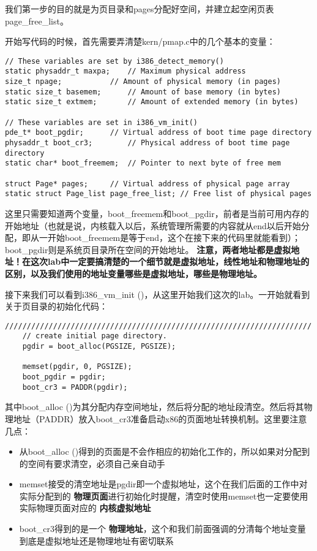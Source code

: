 \documentclass{article}
\newcommand{\highlight}[1]{{\bfseries \color{red}  #1}}
\newcommand{\funcname}[1]{{\ttfamily \small #1}}
\begin{document}
\begin{CJK*}{UTF8}{gkai}
我们第一步的目的就是为页目录和pages分配好空间，并建立起空闲页表page\_free\_list。


开始写代码的时候，首先需要弄清楚kern/pmap.c中的几个基本的变量：

\begin{lstlisting}[style=ccode, firstnumber=12, title={\scriptsize \ttfamily \bfseries kern/pmap.c}]
// These variables are set by i386_detect_memory()
static physaddr_t maxpa;	// Maximum physical address
size_t npage;			// Amount of physical memory (in pages)
static size_t basemem;		// Amount of base memory (in bytes)
static size_t extmem;		// Amount of extended memory (in bytes)

// These variables are set in i386_vm_init()
pde_t* boot_pgdir;		// Virtual address of boot time page directory
physaddr_t boot_cr3;		// Physical address of boot time page directory
static char* boot_freemem;	// Pointer to next byte of free mem

struct Page* pages;		// Virtual address of physical page array
static struct Page_list page_free_list;	// Free list of physical pages
\end{lstlisting}

这里只需要知道两个变量，boot\_freemem和boot\_pgdir，前者是当前可用内存的开始地址（也就是说，内核载入以后，系统管理所需要的内容就从end以后开始分配，即从一开始boot\_freemem是等于end，这个在接下来的代码里就能看到）；boot\_pgdir则是系统页目录所在空间的开始地址。\highlight{注意，两者地址都是虚拟地址！在这次lab中一定要搞清楚的一个细节就是虚拟地址，线性地址和物理地址的区别，以及我们使用的地址变量哪些是虚拟地址，哪些是物理地址。}


接下来我们可以看到\funcname{i386\_vm\_init ()}，从这里开始我们这次的lab。一开始就看到关于页目录的初始化代码：

\begin{lstlisting}[style=ccode, title={\scriptsize \ttfamily \bfseries kern/pmap.c: i386\_vm\_init ()}]
	//////////////////////////////////////////////////////////////////////
	// create initial page directory.
	pgdir = boot_alloc(PGSIZE, PGSIZE);

	memset(pgdir, 0, PGSIZE);
	boot_pgdir = pgdir;
	boot_cr3 = PADDR(pgdir);
\end{lstlisting}

其中\funcname{boot\_alloc ()}为其分配内存空间地址，然后将分配的地址段清空。然后将其物理地址（PADDR）放入boot\_cr3准备启动x86的页面地址转换机制。这里要注意几点：

\begin{itemize}
\item{从\funcname{boot\_alloc ()}得到的页面是不会作相应的初始化工作的，所以如果对分配到的空间有要求清空，必须自己亲自动手}
\item{\funcname{memset}接受的清空地址是pgdir即一个虚拟地址，这个在我们后面的工作中对实际分配到的\highlight{物理页面}进行初始化时提醒，清空时使用\funcname{memset}也一定要使用实际物理页面对应的\highlight{内核虚拟地址}}
\item{boot\_cr3得到的是一个\highlight{物理地址}，这个和我们前面强调的分清每个地址变量到底是虚拟地址还是物理地址有密切联系}
\end{itemize}


\end{CJK*}
\end{document}

